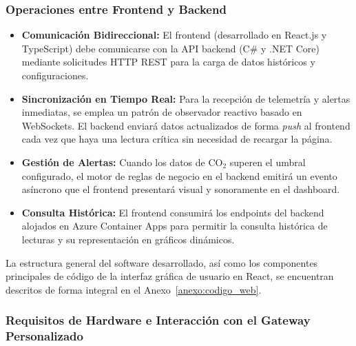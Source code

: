 \subsubsection{Operaciones entre Frontend y Backend}

\begin{itemize}
    \item \textbf{Comunicación Bidireccional:} El frontend (desarrollado en React.js y TypeScript) debe comunicarse con la API backend (C\# y .NET Core) mediante solicitudes HTTP REST para la carga de datos históricos y configuraciones.
    \item \textbf{Sincronización en Tiempo Real:} Para la recepción de telemetría y alertas inmediatas, se emplea un patrón de observador reactivo basado en WebSockets. El backend enviará datos actualizados de forma \textit{push} al frontend cada vez que haya una lectura crítica sin necesidad de recargar la página.
    \item \textbf{Gestión de Alertas:} Cuando los datos de CO\(_2\) superen el umbral configurado, el motor de reglas de negocio en el backend emitirá un evento asíncrono que el frontend presentará visual y sonoramente en el dashboard.
    \item \textbf{Consulta Histórica:} El frontend consumirá los endpoints del backend alojados en Azure Container Apps para permitir la consulta histórica de lecturas y su representación en gráficos dinámicos.
\end{itemize}

La estructura general del software desarrollado, así como los componentes principales de código de la interfaz gráfica de usuario en React, se encuentran descritos de forma integral en el Anexo~\ref{anexo:codigo_web}.

\subsubsection{Requisitos de Hardware e Interacción con el Gateway Personalizado}


